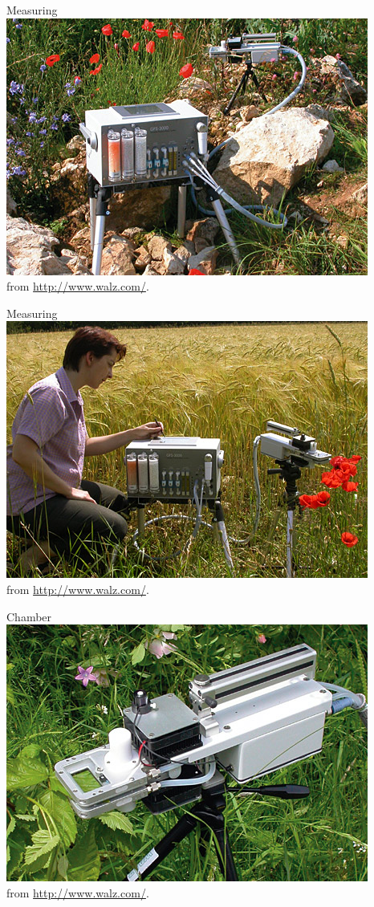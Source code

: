 \documentclass[10pt]{beamer}\usepackage[]{graphicx}\usepackage[]{color}
\begin{document}
\begin{frame}{Measuring}
    \centering
    \includegraphics[height=0.7\textheight]{photos/GFS-3000_1big}\\
    {\small from \url{http://www.walz.com/}.}
\end{frame}

\begin{frame}{Measuring}
    \centering
    \includegraphics[height=0.7\textheight]{photos/GFS-3000_6big}\\
    {\small from \url{http://www.walz.com/}.}
\end{frame}

\begin{frame}{Chamber}
    \centering
    \includegraphics[height=0.7\textheight]{photos/GFS-3000_3big}\\
    {\small from \url{http://www.walz.com/}.}
\end{frame}
\end{document}
